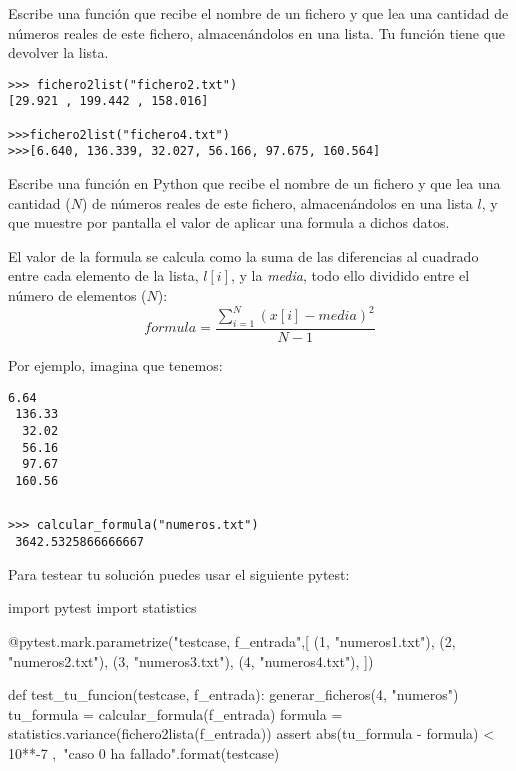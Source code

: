 \begin{ejercicio}
Escribe una función  que recibe 
 el nombre de un fichero y que lea una cantidad de números reales de este fichero, almacenándolos en una lista. Tu función tiene que devolver la lista. \\


\begin{Verbatim}[frame=single, label={\em ejemplo de sesión interactiva}]
>>> fichero2list("fichero2.txt")
[29.921 , 199.442 , 158.016]

>>>fichero2list("fichero4.txt")
>>>[6.640, 136.339, 32.027, 56.166, 97.675, 160.564]
\end{Verbatim}

\end{ejercicio}

\begin{ejercicio}
Escribe una función  en Python que recibe el nombre de un fichero y que lea una cantidad ($N$) de números reales de este fichero, almacenándolos
en una lista $l$, y que muestre por pantalla el valor de aplicar una formula a dichos datos. 

El valor de la formula se calcula como la suma de las diferencias al cuadrado entre cada elemento de la lista, $l[i]$, y la \emph{media}, todo ello dividido entre el número de elementos ($N$):
\begin{equation}
  formula = \frac{\sum_{i=1}^{N} (x[i]-media)^{2}}{N-1}
\end{equation}


Por ejemplo, imagina que tenemos:\\

\begin{Verbatim}[frame=single, label={\em numeros.txt}]
   6.64 
 136.33 
  32.02 
  56.16 
  97.67 
 160.56 
\end{Verbatim}

$\;$\\


\begin{Verbatim}[frame=single, label={\em ejemplo de llamada a la función}]
>>> calcular_formula("numeros.txt")
 3642.5325866666667
\end{Verbatim}

Para testear tu solución puedes usar el siguiente pytest:

\begin{python}
import pytest
import statistics

@pytest.mark.parametrize("testcase, f_entrada",[
(1,  "numeros1.txt"),
(2,  "numeros2.txt"),
(3,  "numeros3.txt"),
(4,  "numeros4.txt"),
])

def test_tu_funcion(testcase, f_entrada):
    generar_ficheros(4, "numeros")
    tu_formula = calcular_formula(f_entrada)
    formula = statistics.variance(fichero2lista(f_entrada))
    assert abs(tu_formula - formula) < 10**-7 ,\
           "caso {0} ha fallado".format(testcase)
\end{python}




\end{ejercicio}
